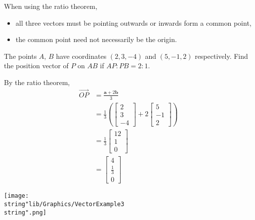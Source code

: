 \documentclass[11pt,a4paper]{book}
\begin{document}
When using the ratio theorem,

\begin{itemize}

\item  all three vectors must be pointing outwards or inwards form
a common point,

\item  the common point need not necessarily be the origin.

\end{itemize}

\newpage

\begin{example}

The points $A$, $B$ have coordinates $\left(2,3,-4\right)$ and
$\left(5,-1,2\right)$ respectively. Find the position vector of $P$
on $AB$ if $AP:PB=2:1$.

\Solution

\begin{minipage}[t]{0.5\textwidth}

By the ratio theorem,
\begin{align*}
\overrightarrow{OP} & =\frac{\textbf{a}+2\textbf{b}}{3}\\
 & =\frac{1}{3}\left(\begin{bmatrix}2\\
3\\
-4
\end{bmatrix}+2\begin{bmatrix}5\\
-1\\
2
\end{bmatrix}\right)\\
 & =\frac{1}{3}\begin{bmatrix}12\\
1\\
0
\end{bmatrix}\\
 & =\begin{bmatrix}4\\
\frac{1}{3}\\
0
\end{bmatrix}
\end{align*}

\end{minipage}
\begin{minipage}[t]{0.1\textwidth}
\begin{center}
\texttt{[image: \\string"lib/Graphics/VectorExample3\\string".png]}
\par\end{center}

\end{minipage}

\end{example}
\end{document}
